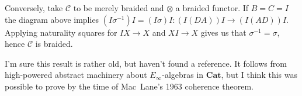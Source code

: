 \documentclass{amsart}
\begin{document}
\medskip
\noindent Conversely, take $\mathcal{C}$ to be merely braided and $\otimes$ a braided functor. If $B=C=I$ the diagram above implies $(I\sigma^{-1})I = (I\sigma)I\colon (I(DA))I \to (I(AD))I$. Applying naturality squares for $IX\to X$ and $XI\to X$ gives us that $\sigma^{-1}=\sigma$, hence $\mathcal{C}$ is braided.
\medskip

\noindent
I'm sure this result is rather old, but haven't found a reference. It follows from high-powered abstract machinery about $E_\infty$-algebras in $\mathbf{Cat}$, but I think this was possible to prove by the time of Mac~Lane's 1963 coherence theorem.
\end{document}
